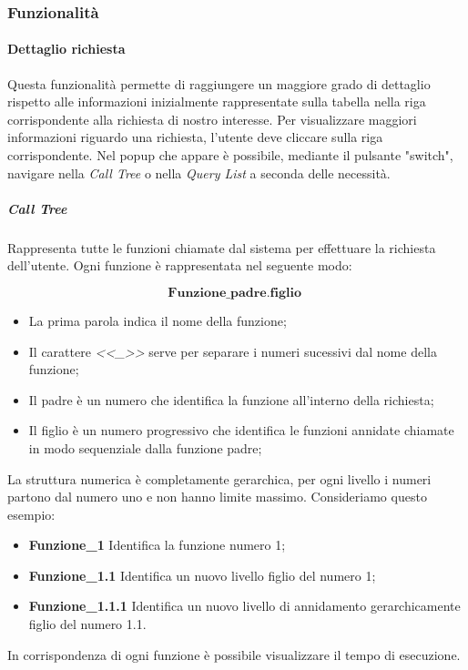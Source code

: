 \subsubsection{Funzionalità}
\paragraph {Dettaglio richiesta} \Spazio
Questa funzionalità permette di raggiungere un maggiore grado di dettaglio rispetto alle informazioni inizialmente rappresentate sulla tabella nella riga corrispondente alla richiesta di nostro interesse.
Per visualizzare maggiori informazioni riguardo una richiesta, l'utente deve cliccare sulla riga corrispondente.
Nel popup che appare è possibile, mediante il pulsante "switch", navigare nella \emph{Call Tree} o nella \emph{Query List} a seconda delle necessità.

\subparagraph {Call Tree} \Spazio
Rappresenta tutte le funzioni chiamate dal sistema per effettuare la richiesta dell'utente.
Ogni funzione è rappresentata nel seguente modo:

$$ \textbf{Funzione\_padre.figlio  } $$

\begin{itemize}
	\item La prima parola indica il nome della funzione;
	\item Il carattere \emph{ <<\_>> } serve per separare i numeri sucessivi dal nome della funzione;
	\item Il padre è un numero che identifica la funzione all'interno della richiesta;
	\item Il figlio è un numero progressivo che identifica le funzioni annidate chiamate in modo sequenziale dalla funzione padre;
\end{itemize}
La struttura numerica è completamente gerarchica, per ogni livello i numeri partono dal numero uno e non hanno limite massimo.
Consideriamo questo esempio:
\begin{itemize}
	\item \textbf{Funzione\_1} Identifica la funzione numero 1;
	\item \textbf{Funzione\_1.1} Identifica un nuovo livello figlio del numero 1;
	\item \textbf{Funzione\_1.1.1} Identifica un nuovo livello di annidamento gerarchicamente figlio del numero 1.1.
\end{itemize}

In corrispondenza di ogni funzione è possibile visualizzare il tempo di esecuzione.

